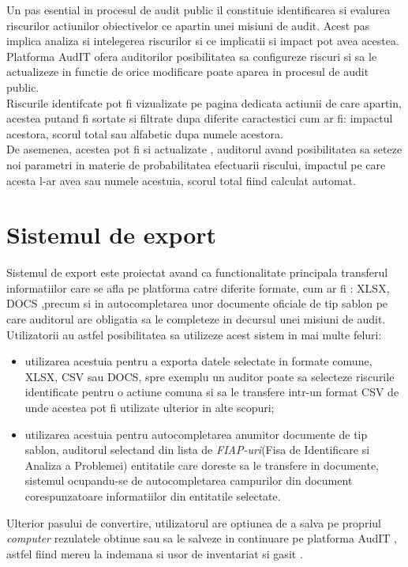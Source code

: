 Un pas esential in procesul de audit public il constituie identificarea si evalurea riscurilor actiunilor obiectivelor ce apartin unei misiuni de audit. Acest pas implica analiza si intelegerea riscurilor si ce implicatii si impact pot avea acestea.\\
 Platforma AudIT ofera auditorilor posibilitatea sa configureze riscuri si sa le actualizeze in functie de orice modificare poate aparea in procesul de audit public.\\
 Riscurile identifcate pot fi vizualizate pe pagina dedicata actiunii de care apartin, acestea putand fi sortate si filtrate dupa diferite caractestici cum ar fi: impactul acestora, scorul total sau alfabetic dupa numele acestora. \\
 De asemenea, acestea pot fi si actualizate , auditorul avand posibilitatea sa seteze noi parametri in materie de probabilitatea efectuarii riscului, impactul pe care acesta l-ar avea sau numele acestuia, scorul total fiind calculat automat.


\section{Sistemul de export}

Sistemul de export este proiectat avand ca functionalitate principala transferul informatiilor care se afla pe platforma catre diferite formate, cum ar fi : XLSX, DOCS ,precum si in autocompletarea unor documente oficiale de tip sablon pe care auditorul are obligatia sa le completeze in decursul unei misiuni de audit.\\
Utilizatorii au astfel posibilitatea sa utilizeze acest sistem in mai multe feluri:

\begin{itemize}

	\item utilizarea acestuia pentru a exporta datele selectate in formate comune, XLSX, CSV sau DOCS, 
	spre exemplu un auditor poate sa selecteze riscurile identificate pentru o actiune comuna si sa le transfere intr-un format CSV de unde acestea pot fi utilizate ulterior in alte scopuri;
	
	\item utilizarea acestuia pentru autocompletarea anumitor documente de tip sablon, auditorul selectand din lista de \textit{FIAP-uri}(Fisa de Identificare si Analiza a Problemei) entitatile care doreste sa le transfere in documente, sistemul ocupandu-se de autocompletarea campurilor din document corespunzatoare informatiilor din entitatile selectate.

\end{itemize}

Ulterior pasului de convertire, utilizatorul are optiunea de a salva pe propriul \textit{computer} 
rezulatele obtinue sau sa le salveze in continuare pe platforma AudIT , astfel fiind mereu la indemana si usor de inventariat si gasit .


